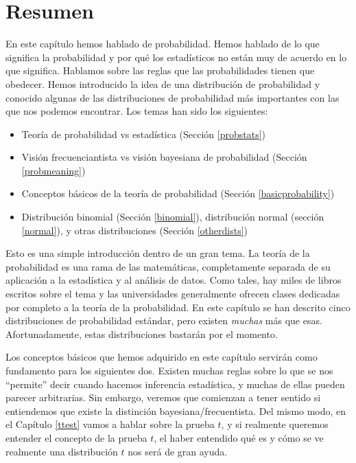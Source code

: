 \documentclass[spanish,]{book}
\providecommand{\tightlist}{%
  \setlength{\itemsep}{0pt}\setlength{\parskip}{0pt}}
\begin{document}
\section{Resumen}\label{resumen}

En este capítulo hemos hablado de probabilidad. Hemos hablado de lo que
significa la probabilidad y por qué los estadísticos no están muy de
acuerdo en lo que significa. Hablamos sobre las reglas que las
probabilidades tienen que obedecer. Hemos introducido la idea de una
distribución de probabilidad y conocido algunas de las distribuciones de
probabilidad más importantes con las que nos podemos encontrar. Los
temas han sido los siguientes:

\begin{itemize}
\tightlist
\item
  Teoría de probabilidad vs estadística (Sección \ref{probstats})
\item
  Visión frecuenciantista vs visión bayesiana de probabilidad (Sección
  \ref{probmeaning})
\item
  Conceptos básicos de la teoría de probabilidad (Sección
  \ref{basicprobability})
\item
  Distribución binomial (Sección \ref{binomial}), distribución normal
  (sección \ref{normal}), y otras distribuciones (Sección
  \ref{otherdists})
\end{itemize}

Esto es una simple introducción dentro de un gran tema. La teoría de la
probabilidad es una rama de las matemáticas, completamente separada de
su aplicación a la estadística y al análisis de datos. Como tales, hay
miles de libros escritos sobre el tema y las universidades generalmente
ofrecen clases dedicadas por completo a la teoría de la probabilidad. En
este capítulo se han descrito cinco distribuciones de probabilidad
estándar, pero existen \emph{muchas} más que esas. Afortunadamente,
estas distribuciones bastarán por el momento.

Los conceptos básicos que hemos adquirido en este capítulo servirán como
fundamento para los siguientes dos. Existen muchas reglas sobre lo que
se nos ``permite'' decir cuando hacemos inferencia estadística, y muchas
de ellas pueden parecer arbitrarias. Sin embargo, veremos que comienzan
a tener sentido si entiendemos que existe la distinción
bayesiana/frecuentista. Del mismo modo, en el Capítulo \ref{ttest} vamos
a hablar sobre la prueba \(t\), y si realmente queremos entender el
concepto de la prueba \(t\), el haber entendido qué es y cómo se ve
realmente una distribución \(t\) nos será de gran ayuda.


\end{document}
